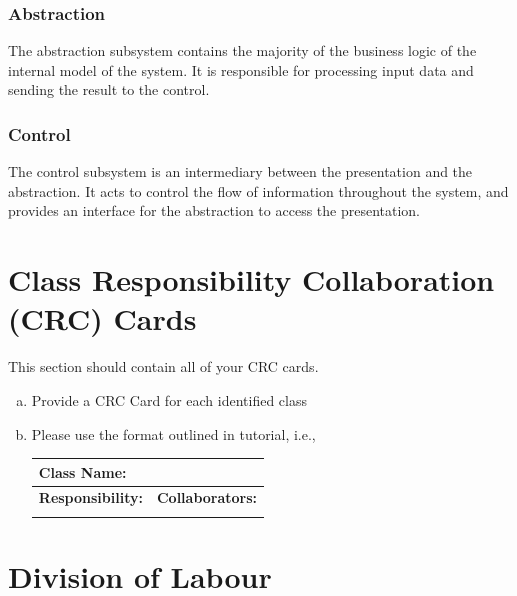 \documentclass[]{article}
\begin{document}
\subsubsection{Abstraction}

The abstraction subsystem contains the majority of the business logic of the
internal model of the system. It is responsible for processing input data and
sending the result to the control.

\subsubsection{Control}

The control subsystem is an intermediary between the presentation and the
abstraction. It acts to control the flow of information throughout the system,
and provides an interface for the abstraction to access the presentation.


	
\section{Class Responsibility Collaboration (CRC) Cards}
\label{sec:class_responsibility_collaboration_crc_cards}
This section should contain all of your CRC cards.

\begin{enumerate}[a)]
	\item Provide a CRC Card for each identified class
	\item Please use the format outlined in tutorial, i.e., 
	\begin{table}[ht]
		\centering
		\begin{tabular}{|p{5cm}|p{5cm}|}
		\hline 
		 \multicolumn{2}{|l|}{\textbf{Class Name:}} \\
		\hline
		\textbf{Responsibility:} & \textbf{Collaborators:} \\
		\hline
		\vspace{1in} & \\
		\hline
		\end{tabular}
	\end{table}
	
\end{enumerate}

\appendix
\newpage
\section{Division of Labour}
\label{sec:division_of_labour}
\end{document}
